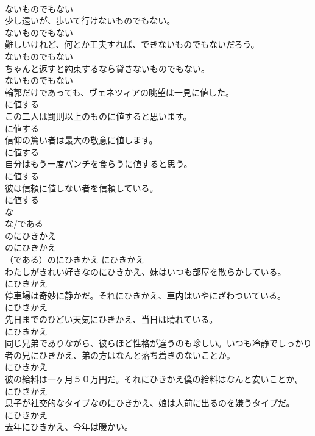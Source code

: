 \documentclass[8pt]{extreport}
\begin{document}
\begin{CJK}{UTF8}{min}
\\	ないものでもない
\\	少し遠いが、歩いて行けないものでもない。	
\\	ないものでもない
\\	難しいけれど、何とか工夫すれば、できないものでもないだろう。	
\\	ないものでもない
\\	ちゃんと返すと約束するなら貸さないものでもない。	
\\	ないものでもない
\\	輪郭だけであっても、ヴェネツィアの眺望は一見に値した。	
\\	に値する
\\	この二人は罰則以上のものに値すると思います。	
\\	に値する
\\	信仰の篤い者は最大の敬意に値します。	
\\	に値する
\\	自分はもう一度パンチを食らうに値すると思う。	
\\	に値する
\\	彼は信頼に値しない者を信頼している。	
\\	に値する
\\	な
\\	な/である 
\\	のにひきかえ	
\\	のにひきかえ	
\\	（である）のにひきかえ	にひきかえ
\\	わたしがきれい好きなのにひきかえ、妹はいつも部屋を散らかしている。	
\\	にひきかえ
\\	停車場は奇妙に静かだ。それにひきかえ、車内はいやにざわついている。	
\\	にひきかえ
\\	先日までのひどい天気にひきかえ、当日は晴れている。	
\\	にひきかえ
\\	同じ兄弟でありながら、彼らほど性格が違うのも珍しい。いつも冷静でしっかり者の兄にひきかえ、弟の方はなんと落ち着きのないことか。	
\\	にひきかえ
\\	彼の給料は一ヶ月５０万円だ。それにひきかえ僕の給料はなんと安いことか。	
\\	にひきかえ
\\	息子が社交的なタイプなのにひきかえ、娘は人前に出るのを嫌うタイプだ。	
\\	にひきかえ
\\	去年にひきかえ、今年は暖かい。	

\end{CJK}
\end{document}
